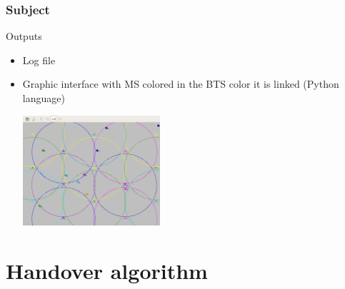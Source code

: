 \documentclass{beamer}
\begin{document}
\begin{frame}
\frametitle{Subject}
Outputs\\

\begin{itemize}
    \item Log file
    \item Graphic interface with MS colored in the BTS color it is linked
(Python language)
      \begin{center}
        \includegraphics[width=0.4\textwidth]{./images/capture.png}
      \end{center}
\end{itemize}

\end{frame}

\section{Handover algorithm}
\end{document}
